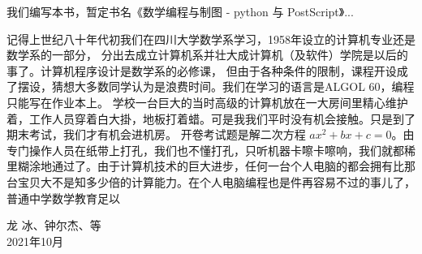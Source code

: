 \documentclass[main.tex]{subfiles}
\begin{document}
我们编写本书，暂定书名《数学编程与制图 - python 与 PostScript》...

记得上世纪八十年代初我们在四川大学数学系学习，1958年设立的计算机专业还是数学系的一部分，
分出去成立计算机系并壮大成计算机（及软件）学院是以后的事了。计算机程序设计是数学系的必修课，
但由于各种条件的限制，课程开设成了摆设，猜想大多数同学认为是浪费时间。我们在学习的语言是ALGOL 60，编程只能写在作业本上。
学校一台巨大的当时高级的计算机放在一大房间里精心维护着，工作人员穿着白大掛，地板打着蜡。可是我我们平时没有机会接触。只是到了期末考试，我们才有机会进机房。
开卷考试题是解二次方程 $ax^2+bx+c = 0$。由专门操作人员在纸带上打孔，我们也不懂打孔，只听机器卡嚓卡嚓响，我们就都稀里糊涂地通过了。由于计算机技术的巨大进步，任何一台个人电脑的都会拥有比那台宝贝大不是知多少倍的计算能力。在个人电脑编程也是件再容易不过的事儿了，普通中学数学教育足以

\begin{flushright}
龙 冰、钟尔杰、等\\
2021年10月
\end{flushright}
\end{document}
